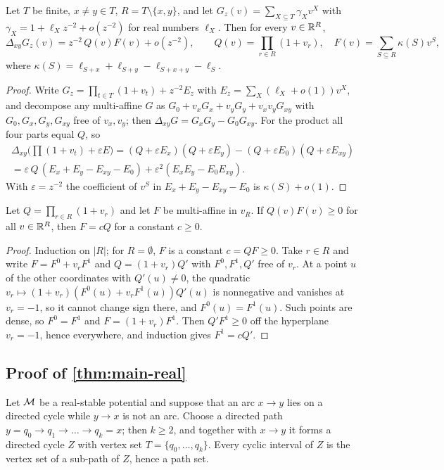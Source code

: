 \begin{lemma}\label{lem:first-order}
Let $T$ be finite, $x\ne y\in T$, $R=T\setminus\{x,y\}$, and let $G_z(v)=\sum_{X\subseteq T}\gamma_Xv^X$ with $\gamma_X=1+\ell_Xz^{-2}+o(z^{-2})$ for real numbers $\ell_X$. Then for every $v\in\mathbb{R}^R$,
\[
\Delta_{xy}G_z(v)=z^{-2}\,Q(v)F(v)+o(z^{-2}),\qquad Q(v)=\prod_{r\in R}(1+v_r),\quad F(v)=\sum_{S\subseteq R}\kappa(S)v^S,
\]
where $\kappa(S)=\ell_{S+x}+\ell_{S+y}-\ell_{S+x+y}-\ell_S$.
\end{lemma}
\begin{proof}
Write $G_z=\prod_{t\in T}(1+v_t)+z^{-2}E_z$ with $E_z=\sum_X(\ell_X+o(1))v^X$, and decompose any multi-affine $G$ as $G_0+v_xG_x+v_yG_y+v_xv_yG_{xy}$ with $G_0,G_x,G_y,G_{xy}$ free of $v_x,v_y$; then $\Delta_{xy}G=G_xG_y-G_0G_{xy}$. For the product all four parts equal $Q$, so
\begin{multline*}
\Delta_{xy}\bigl(\textstyle\prod(1+v_t)+\varepsilon E\bigr)=(Q+\varepsilon E_x)(Q+\varepsilon E_y)-(Q+\varepsilon E_0)(Q+\varepsilon E_{xy})\\
=\varepsilon\,Q\,(E_x+E_y-E_{xy}-E_0)+\varepsilon^2(E_xE_y-E_0E_{xy}).
\end{multline*}
With $\varepsilon=z^{-2}$ the coefficient of $v^S$ in $E_x+E_y-E_{xy}-E_0$ is $\kappa(S)+o(1)$.
\end{proof}

\begin{lemma}[vanishing]\label{lem:vanishing}
Let $Q=\prod_{r\in R}(1+v_r)$ and let $F$ be multi-affine in $v_R$. If $Q(v)F(v)\ge0$ for all $v\in\mathbb{R}^R$, then $F=cQ$ for a constant $c\ge0$.
\end{lemma}
\begin{proof}
Induction on $|R|$; for $R=\emptyset$, $F$ is a constant $c=QF\ge0$. Take $r\in R$ and write $F=F^0+v_rF^1$ and $Q=(1+v_r)Q'$ with $F^0,F^1,Q'$ free of $v_r$. At a point $u$ of the other coordinates with $Q'(u)\ne0$, the quadratic $v_r\mapsto(1+v_r)(F^0(u)+v_rF^1(u))Q'(u)$ is nonnegative and vanishes at $v_r=-1$, so it cannot change sign there, and $F^0(u)=F^1(u)$. Such points are dense, so $F^0=F^1$ and $F=(1+v_r)F^1$. Then $Q'F^1\ge0$ off the hyperplane $v_r=-1$, hence everywhere, and induction gives $F^1=cQ'$.
\end{proof}

\subsection{Proof of \texorpdfstring{\cref{thm:main-real}}{Theorem 9.5}}
Let $\mathcal{M}$ be a real-stable potential and suppose that an arc $x\to y$ lies on a directed cycle while $y\to x$ is not an arc. Choose a directed path $y=q_0\to q_1\to\dots\to q_k=x$; then $k\ge2$, and together with $x\to y$ it forms a directed cycle $Z$ with vertex set $T=\{q_0,\dots,q_k\}$. Every cyclic interval of $Z$ is the vertex set of a sub-path of $Z$, hence a path set.

